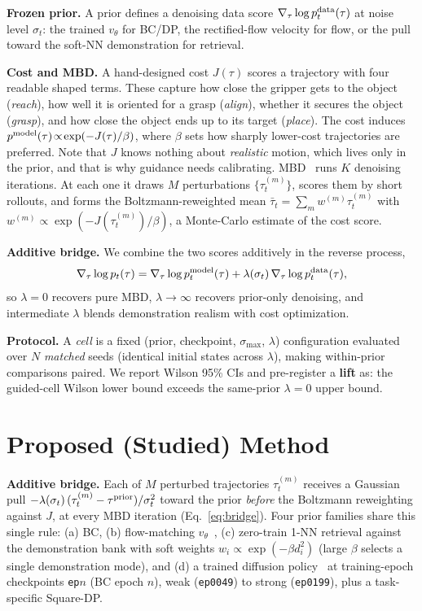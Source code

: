 \documentclass[letterpaper, 10 pt, conference]{ieeeconf}
\begin{document}
\textbf{Frozen prior.} A prior defines a denoising data score
$\nabla_\tau\log p^{\rm data}_t(\tau)$ at noise level $\sigma_t$: the
trained $v_\theta$ for BC/DP, the rectified-flow velocity for flow, or the
pull toward the soft-NN demonstration for retrieval.

\textbf{Cost and MBD.} A hand-designed cost $J(\tau)$ scores a trajectory
with four readable shaped terms. These capture how close the gripper gets
to the object (\emph{reach}), how well it is oriented for a grasp
(\emph{align}), whether it secures the object (\emph{grasp}), and how close
the object ends up to its target (\emph{place}). The cost induces
$p^{\rm model}(\tau)\!\propto\!\exp(-J(\tau)/\beta)$, where $\beta$ sets
how sharply lower-cost trajectories are preferred. Note that $J$ knows
nothing about \emph{realistic} motion, which lives only in the prior, and
that is why guidance needs calibrating.
MBD~\cite{mbd} runs $K$ denoising iterations. At each one it draws $M$
perturbations $\{\tau_t^{(m)}\}$, scores them by short rollouts, and forms
the Boltzmann-reweighted mean $\bar\tau_t=\sum_m w^{(m)}\tau_t^{(m)}$ with
$w^{(m)}\!\propto\!\exp(-J(\tau_t^{(m)})/\beta)$, a Monte-Carlo estimate of
the cost score.

\textbf{Additive bridge.} We combine the two scores additively in the
reverse process,
\begin{equation}
\nabla_\tau\log p_t(\tau)=\nabla_\tau\log p^{\rm model}_t(\tau)
+\lambda(\sigma_t)\,\nabla_\tau\log p^{\rm data}_t(\tau),
\label{eq:bridge}
\end{equation}
so $\lambda\!=\!0$ recovers pure MBD, $\lambda\!\to\!\infty$ recovers
prior-only denoising, and intermediate $\lambda$ blends demonstration
realism with cost optimization.

\textbf{Protocol.} A \emph{cell} is a fixed
(prior, checkpoint, $\sigma_{\max}$, $\lambda$) configuration evaluated
over $N$ \emph{matched} seeds (identical initial states across $\lambda$),
making within-prior comparisons paired. We report Wilson 95\% CIs and
pre-register a \textbf{lift} as: the guided-cell Wilson lower bound exceeds
the same-prior $\lambda\!=\!0$ upper bound.

\section{Proposed (Studied) Method}

\textbf{Additive bridge.} Each of $M$ perturbed trajectories
$\tau_t^{(m)}$ receives a Gaussian pull
$-\lambda(\sigma_t)\,(\tau_t^{(m)}-\tau^{\rm prior})/\sigma_t^2$ toward the
prior \emph{before} the Boltzmann reweighting against $J$, at every MBD
iteration (Eq.~\ref{eq:bridge}). Four prior families share this single
rule: (a) BC, (b) flow-matching $v_\theta$~\cite{rectflow}, (c) zero-train
1-NN retrieval against the demonstration bank with soft weights
$w_i\!\propto\!\exp(-\beta d_i^2)$ (large $\beta$ selects a single
demonstration mode), and (d) a trained diffusion policy~\cite{dp} at training-epoch
checkpoints \texttt{ep}$n$ (BC epoch $n$), weak (\texttt{ep0049}) to strong
(\texttt{ep0199}), plus a task-specific Square-DP.
\end{document}
